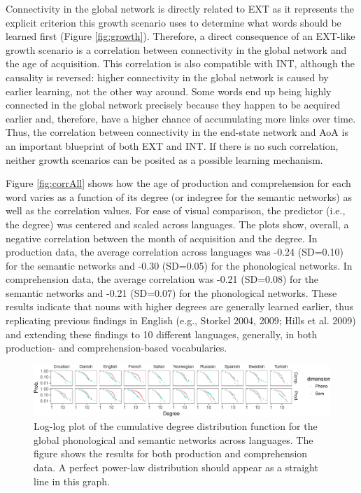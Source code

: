 \documentclass[english,floatsintext,man]{apa6}
\theoremstyle{definition}
\theoremstyle{definition}
\theoremstyle{definition}
\theoremstyle{remark}
\begin{document}
Connectivity in the global network is directly related to EXT as it
represents the explicit criterion this growth scenario uses to determine
what words should be learned first (Figure \ref{fig:growth}). Therefore,
a direct consequence of an EXT-like growth scenario is a correlation
between connectivity in the global network and the age of acquisition.
This correlation is also compatible with INT, although the causality is
reversed: higher connectivity in the global network is caused by earlier
learning, not the other way around. Some words end up being highly
connected in the global network precisely because they happen to be
acquired earlier and, therefore, have a higher chance of accumulating
more links over time. Thus, the correlation between connectivity in the
end-state network and AoA is an important blueprint of both EXT and INT.
If there is no such correlation, neither growth scenarios can be posited
as a possible learning mechanism.

Figure \ref{fig:corrAll} shows how the age of production and
comprehension for each word varies as a function of its degree (or
indegree for the semantic networks) as well as the correlation values.
For ease of visual comparison, the predictor (i.e., the degree) was
centered and scaled across languages. The plots show, overall, a
negative correlation between the month of acquisition and the degree. In
production data, the average correlation across languages was -0.24
(SD=0.10) for the semantic networks and -0.30 (SD=0.05) for the
phonological networks. In comprehension data, the average correlation
was -0.21 (SD=0.08) for the semantic networks and -0.21 (SD=0.07) for
the phonological networks. These results indicate that nouns with higher
degrees are generally learned earlier, thus replicating previous
findings in English (e.g., Storkel 2004, 2009; Hills et al. 2009) and
extending these findings to 10 different languages, generally, in both
production- and comprehension-based vocabularies.

\begin{figure}[!h]
\includegraphics[width=\textwidth]{ms_files/figure-latex/degreeDist-1} \caption{Log-log plot of the cumulative degree distribution function for the global phonological and semantic networks across languages. The figure shows the results for both production and comprehension data. A perfect power-law distribution should appear as a straight line in this graph.}\label{fig:degreeDist}
\end{figure}
\end{document}

